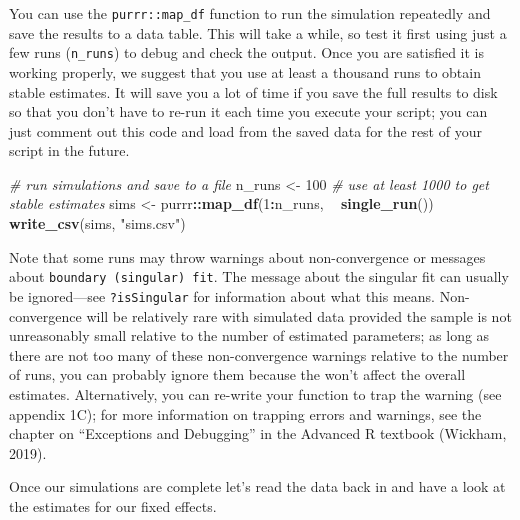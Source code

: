 \documentclass[
  english,
  doc,floatsintext]{apa6}
\newenvironment{Shaded}{\begin{snugshade}}{\end{snugshade}}
\newcommand{\CommentTok}[1]{\textcolor[rgb]{0.56,0.35,0.01}{\textit{#1}}}
\newcommand{\DecValTok}[1]{\textcolor[rgb]{0.00,0.00,0.81}{#1}}
\newcommand{\KeywordTok}[1]{\textcolor[rgb]{0.13,0.29,0.53}{\textbf{#1}}}
\newcommand{\NormalTok}[1]{#1}
\newcommand{\OperatorTok}[1]{\textcolor[rgb]{0.81,0.36,0.00}{\textbf{#1}}}
\newcommand{\StringTok}[1]{\textcolor[rgb]{0.31,0.60,0.02}{#1}}
\begin{document}
You can use the \texttt{purrr::map\_df} function to run the simulation repeatedly and save the results to a data table. This will take a while, so test it first using just a few runs (\texttt{n\_runs}) to debug and check the output. Once you are satisfied it is working properly, we suggest that you use at least a thousand runs to obtain stable estimates. It will save you a lot of time if you save the full results to disk so that you don't have to re-run it each time you execute your script; you can just comment out this code and load from the saved data for the rest of your script in the future.

\begin{Shaded}
\begin{Highlighting}[]
\CommentTok{# run simulations and save to a file}
\NormalTok{n_runs <-}\StringTok{ }\DecValTok{100} \CommentTok{# use at least 1000 to get stable estimates}
\NormalTok{sims <-}\StringTok{ }\NormalTok{purrr}\OperatorTok{::}\KeywordTok{map_df}\NormalTok{(}\DecValTok{1}\OperatorTok{:}\NormalTok{n_runs, }\OperatorTok{~}\StringTok{ }\KeywordTok{single_run}\NormalTok{())}
\KeywordTok{write_csv}\NormalTok{(sims, }\StringTok{"sims.csv"}\NormalTok{)}
\end{Highlighting}
\end{Shaded}

Note that some runs may throw warnings about non-convergence or messages about \texttt{boundary\ (singular)\ fit}. The message about the singular fit can usually be ignored---see \texttt{?isSingular} for information about what this means. Non-convergence will be relatively rare with simulated data provided the sample is not unreasonably small relative to the number of estimated parameters; as long as there are not too many of these non-convergence warnings relative to the number of runs, you can probably ignore them because the won't affect the overall estimates. Alternatively, you can re-write your function to trap the warning (see appendix 1C); for more information on trapping errors and warnings, see the chapter on \enquote{Exceptions and Debugging} in the Advanced R textbook (Wickham, 2019).

Once our simulations are complete let's read the data back in and have a look at the estimates for our fixed effects.
\end{document}
